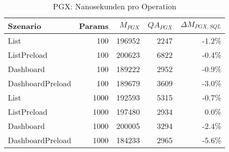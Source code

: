 
\begin{table}[ht]
\centering
\caption{PGX: Nanosekunden pro Operation}
\begin{tabular}{lrrrr}
\toprule
Szenario & Params & ${M_{PGX}}$ & ${QA_{PGX}}$ & ${\Delta M_{PGX,SQL}}$  \\
\midrule

	List & 100 & 196952 & 2247 & -1.2\% \\
	ListPreload & 100 & 200623 & 6822 & -0.4\% \\
	Dashboard & 100 & 189222 & 2952 & -0.9\% \\
	DashboardPreload & 100 & 189679 & 3609 & -3.0\% \\
	List & 1000 & 192593 & 5315 & -0.7\% \\
	ListPreload & 1000 & 197480 & 2934 & 0.0\% \\
	Dashboard & 1000 & 200005 & 3294 & -2.4\% \\
	DashboardPreload & 1000 & 184233 & 2965 & -5.6\% \\
\bottomrule
\end{tabular}
\label{tab:benchmark_pgx_nsperop}
\end{table}
	
